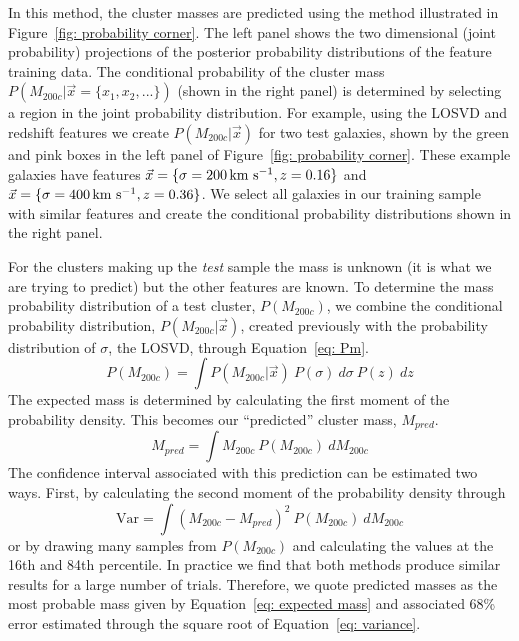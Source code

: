 \documentclass[fleqn,usenatbib]{mnras}
\begin{document}
In this method, the cluster masses are predicted using the method illustrated in Figure~\ref{fig: probability corner}. The left panel shows the two dimensional (joint probability) projections of the posterior probability distributions of the feature training data. The conditional probability of the cluster mass $P(M_{200c}|\vec{x}= \{ x_1,x_2,...\})$ (shown in the right panel) is determined by selecting a region in the joint probability distribution. For example, using the LOSVD and redshift features we create $P(M_{200c}|\vec{x})$ for two test galaxies, shown by the green and pink boxes in the left panel of Figure~\ref{fig: probability corner}. These example galaxies have features $\vec{x} = \{\sigma=200\, \hbox{km~s$^{-1}$},z=0.16\}$ and $\vec{x} = \{\sigma=400\, \hbox{km~s$^{-1}$},z=0.36\}$. We select all galaxies in our training sample with similar features and create the conditional probability distributions shown in the right panel.

For the clusters making up the \emph{test} sample the mass is unknown (it is what we are trying to predict) but the other features are known. To determine the mass probability distribution of a test cluster, $P(M_{200c})$, we combine the conditional probability distribution, $P(M_{200c}|\vec{x})$, created previously with the probability distribution of $\sigma$, the LOSVD, through Equation~\ref{eq: Pm}.
\begin{equation}\label{eq: Pm}
	P(M_{200c}) = \int P(M_{200c}|\vec{x})\ P(\sigma)\ d\sigma\ P(z)\ dz
\end{equation}
The expected mass is determined by calculating the first moment of the probability density. This becomes our ``predicted'' cluster mass, $M_{pred}$.
\begin{equation}\label{eq: expected mass}
	M_{pred}= \int M_{200c}\ P(M_{200c})\ dM_{200c}
\end{equation}
The confidence interval associated with this prediction can be estimated two ways. First, by calculating the second moment of the probability density through
\begin{equation}\label{eq: variance}
	\mathrm{Var} = \int (M_{200c} - M_{pred})^2\ P(M_{200c})\ dM_{200c}
\end{equation}
or by drawing many samples from $P(M_{200c})$ and calculating the values at the 16th and 84th percentile. In practice we find that both methods produce similar results for a large number of trials. Therefore, we quote predicted masses as the most probable mass given by Equation~\ref{eq: expected mass} and associated 68\% error estimated through the square root of Equation~\ref{eq: variance}.
\end{document}
